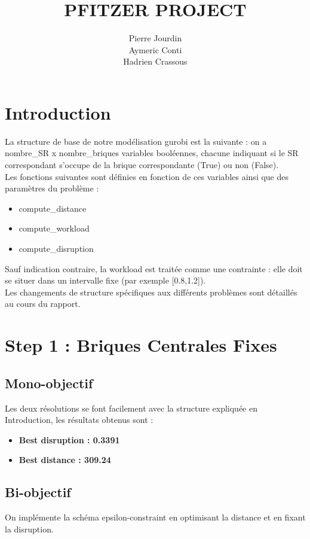 \documentclass[12pt,a4paper]{article}
\title{PFITZER PROJECT}
\author{Pierre Jourdin \\ Aymeric Conti \\ Hadrien Crassous}
\begin{document}
\maketitle

\section*{Introduction}

La structure de base de notre modélisation gurobi est la suivante : on a nombre\_SR x nombre\_briques variables booléennes, chacune indiquant si le SR correspondant s'occupe de la brique correspondante (True) ou non (False).\\
Les fonctions suivantes sont définies en fonction de ces variables ainsi que des paramètres du problème :
\begin{itemize}
    \item compute\_distance
    \item compute\_workload
    \item compute\_disruption
\end{itemize}
Sauf indication contraire, la workload est traitée comme une contrainte : elle doit se situer dans un intervalle fixe (par exemple [0.8,1.2]).\\
Les changements de structure spécifiques aux différents problèmes sont détaillés au cours du rapport.

\section*{Step 1 : Briques Centrales Fixes}

\subsection*{Mono-objectif}

Les deux résolutions se font facilement avec la structure expliquée en Introduction, les résultats obtenus sont :
\begin{itemize}
    \item \textbf{Best disruption : 0.3391}
    \item \textbf{Best distance : 309.24}
\end{itemize}

\subsection*{Bi-objectif}
On implémente la schéma epsilon-constraint en optimisant la distance et en fixant la disruption.
\end{document}
